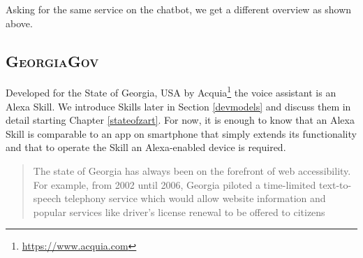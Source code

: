 
\noindent Asking for the same service on the chatbot, we get a %
different overview as shown above. %
%



\subsection*{\textsc{GeorgiaGov}}
Developed for the State of Georgia, USA by Acquia\footnote{\url{https://www.acquia.com}} the voice assistant is an Alexa Skill. We introduce Skills later in Section \ref{devmodels} and discuss them in detail starting Chapter \ref{stateofzart}. For now, it is enough to know that an Alexa Skill is comparable to an app on smartphone that simply extends its functionality and that to operate the Skill an Alexa-enabled device is required.

\begin{quotation}
	\noindent The state of Georgia has always been on the forefront of web accessibility. For example, from 2002 until 2006, Georgia piloted a time-limited text-to-speech telephony service which would allow website information and popular services like driver's license renewal to be offered to citizens \cite{dries:georgia}
\end{quotation} 


